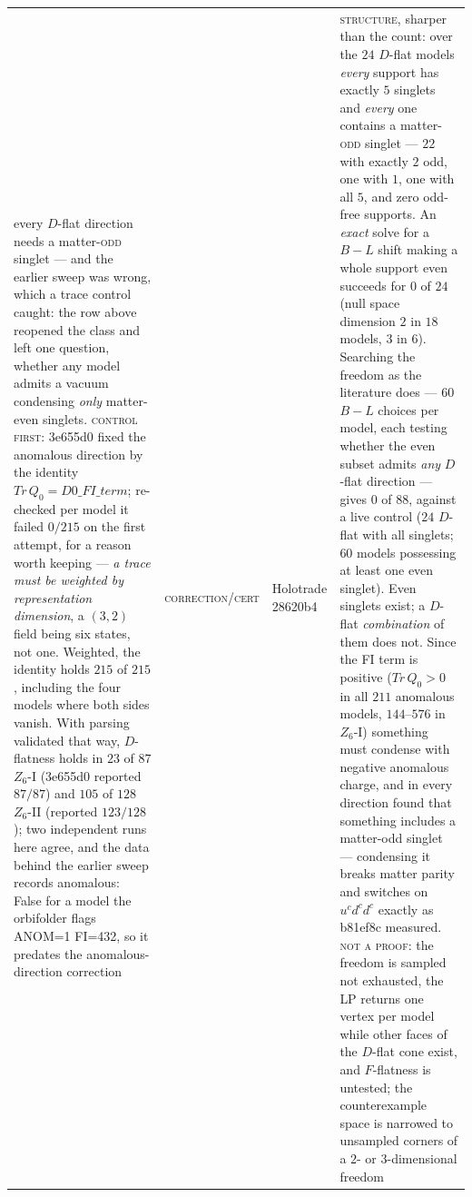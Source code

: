 \documentclass[12pt,a4paper]{article}
\def\mathrm#1{#1}%
\def\mathbf#1{#1}%
\def\textbf#1{#1}%
\def\texttt#1{#1}%
\theoremstyle{definition}
\begin{document}
\begin{center}
\begin{tabular}{@{}p{}llp{}@{}}
\textbf{every $D$-flat direction needs a matter-\textsc{odd} singlet --- and the earlier sweep was wrong, which a trace control caught}: the row above reopened the class and left one question, whether any model admits a vacuum condensing \emph{only} matter-even singlets. \textsc{control first}: \texttt{3e655d0} fixed the anomalous direction by the identity $\mathrm{Tr}\,Q_0=D0\_FI\_term$; re-checked per model it failed $0/215$ on the first attempt, for a reason worth keeping --- \emph{a trace must be weighted by representation dimension}, a $(\mathbf 3,\mathbf 2)$ field being six states, not one. Weighted, the identity holds \textbf{$215$ of $215$}, including the four models where both sides vanish. With parsing validated that way, $D$-flatness holds in $23$ of $87$ $Z_6$-I (\texttt{3e655d0} reported $87/87$) and $105$ of $128$ $Z_6$-II (reported $123/128$); two independent runs here agree, and the data behind the earlier sweep records \texttt{anomalous: False} for a model the orbifolder flags \texttt{ANOM=1 FI=432}, so it predates the anomalous-direction correction & \textsc{correction}/\textsc{cert} & Holotrade \texttt{28620b4} & \textsc{structure}, sharper than the count: over the $24$ $D$-flat models \emph{every} support has \textbf{exactly $5$} singlets and \emph{every} one contains a matter-\textsc{odd} singlet --- $22$ with exactly $2$ odd, one with $1$, one with all $5$, and \textbf{zero} odd-free supports. An \emph{exact} solve for a $B-L$ shift making a whole support even succeeds for $0$ of $24$ (null space dimension $2$ in $18$ models, $3$ in $6$). Searching the freedom as the literature does --- $60$ $B-L$ choices per model, each testing whether the even subset admits \emph{any} $D$-flat direction --- gives $\mathbf{0}$ of $88$, against a live control ($24$ $D$-flat with all singlets; $60$ models possessing at least one even singlet). Even singlets exist; a $D$-flat \emph{combination} of them does not. Since the FI term is positive ($\mathrm{Tr}\,Q_0>0$ in all $211$ anomalous models, $144$--$576$ in $Z_6$-I) something must condense with negative anomalous charge, and in every direction found that something includes a matter-odd singlet --- condensing it breaks matter parity and switches on $u^cd^cd^c$ exactly as \texttt{b81ef8c} measured. \textsc{not a proof}: the freedom is sampled not exhausted, the LP returns one vertex per model while other faces of the $D$-flat cone exist, and $F$-flatness is untested; the counterexample space is narrowed to unsampled corners of a $2$- or $3$-dimensional freedom \\

\end{tabular}
\end{center}
\end{document}
